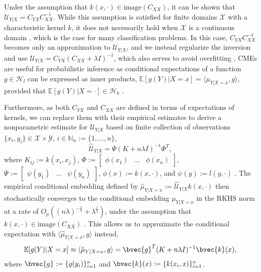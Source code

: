 \documentclass[twoside]{article}
\begin{document}
			Under the assumption that $k(x, \cdot) \in \mathrm{image}(C_{XX})$, it can be shown that $\mathcal{U}_{Y | X} = C_{YX} C_{XX}^{-1}$. While this assumption is satisfied for finite domains $\mathcal{X}$ with a characteristic kernel $k$, it does not necessarily hold when $\mathcal{X}$ is a continuous domain \citep{fukumizu2004dimensionality}, which is the case for many classification problems. In this case, $C_{YX} C_{XX}^{-1}$ becomes only an approximation to $\mathcal{U}_{Y | X}$, and we instead regularize the inversion and use $\mathcal{U}_{Y | X} = C_{YX} (C_{XX} + \lambda I)^{-1}$, which also serves to avoid overfitting \citep{song2013kernel}. \glspl{CME} are useful for probabilistic inference as conditional expectations of a function $g \in \mathcal{H}_{l}$ can be expressed as inner products, $\mathbb{E}[g(Y) | X = x] = \langle \mu_{Y | X = x}, g \rangle$, provided that $\mathbb{E}[g(Y) | X = \cdot] \in \mathcal{H}_{k}$ \citep[Theorem 4]{song2009hilbert}.
				
			Furthermore, as both $C_{YX}$ and $C_{XX}$ are defined in terms of expectations of kernels, we can replace them with their empirical estimates to derive a nonparametric estimate for $\mathcal{U}_{Y | X}$ based on finite collection of observations $\{x_{i}, y_{i}\} \in \mathcal{X} \times \mathcal{Y}$, $i \in \mathbb{N}_{n} := \{1, \dots, n\}$,
			\begin{equation}
			\hat{\mathcal{U}}_{Y | X} = \Psi (K + n \lambda I)^{-1} \Phi^{T},
			\label{eq:empirical_conditional_embedding}
			\end{equation}
			where $K_{ij} := k(x_{i}, x_{j})$, $\Phi := \begin{bmatrix} \phi(x_{1}) & \dots & \phi(x_{n}) \end{bmatrix}$, $\Psi := \begin{bmatrix} \psi(y_{1}) & \dots & \psi(y_{n}) \end{bmatrix}$, $\phi(x) := k(x, \cdot)$, and $\psi(y) := l(y, \cdot)$ \citep{song2013kernel}. The empirical conditional embedding defined by $\hat{\mu}_{Y | X = x} := \hat{\mathcal{U}}_{Y | X} k(x, \cdot)$ then stochastically converges to the conditional embedding $\mu_{Y | X = x}$ in the RKHS norm at a rate of $O_{p}((n \lambda)^{-\frac{1}{2}} + \lambda^{\frac{1}{2}})$, under the assumption that $k(x, \cdot) \in \mathrm{image}(C_{XX})$ \cite[Theorem 6]{song2009hilbert}. This allows us to approximate the conditional expectation with $\langle \hat{\mu}_{Y | X = x}, g \rangle$ instead, 
			\begin{equation}
			\mathbb{E}[g(Y) | X = x] \approx \langle \hat{\mu}_{Y | X = x}, g \rangle = \bvec{g}^{T} (K + n \lambda I)^{-1} \bvec{k}(x),
			\label{eq:empirical_conditional_expectation}
			\end{equation}
			where $\bvec{g} := \{g(y_{i})\}_{i = 1}^{n}$ and $\bvec{k}(x) := \{k(x_{i}, x)\}_{i = 1}^{n}$.
			
\end{document}
